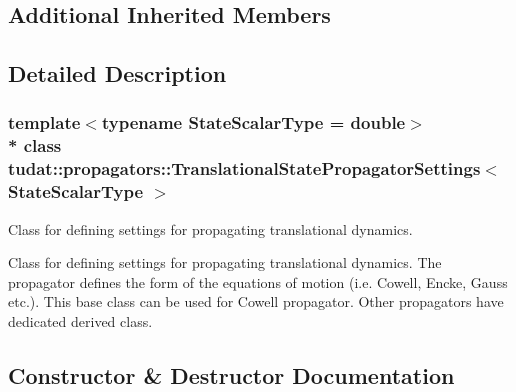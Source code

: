 \subsection*{Additional Inherited Members}


\subsection{Detailed Description}
\subsubsection*{template$<$typename State\+Scalar\+Type = double$>$\\*
class tudat\+::propagators\+::\+Translational\+State\+Propagator\+Settings$<$ State\+Scalar\+Type $>$}

Class for defining settings for propagating translational dynamics. 

Class for defining settings for propagating translational dynamics. The propagator defines the form of the equations of motion (i.\+e. Cowell, Encke, Gauss etc.). This base class can be used for Cowell propagator. Other propagators have dedicated derived class. 

\subsection{Constructor \& Destructor Documentation}
